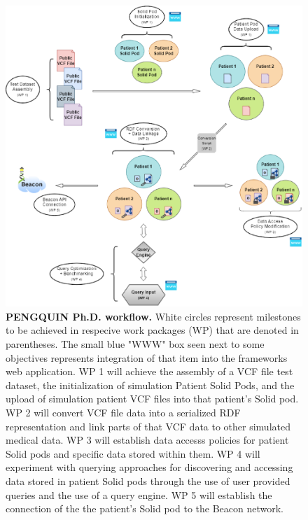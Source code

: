 \documentclass[runningheads]{llncs}
\begin{document}
\begin{figure}
\includegraphics[width=\textwidth]{fig1.eps}
\caption{\textbf{PENGQUIN Ph.D. workflow.}
White circles represent milestones to be achieved in respecive work packages (WP) that are denoted in parentheses. 
The small blue "WWW" box seen next to some objectives represents integration of that item into the framework\textquotesingle s web application.
WP 1 will achieve the assembly of a VCF file test dataset, the initialization of simulation Patient Solid Pods, and the upload of simulation patient VCF files into that patient's Solid pod.
WP 2 will convert VCF file data into a serialized RDF representation and link parts of that VCF data to other simulated medical data.
WP 3 will establish data accesss policies for patient Solid pods and specific data stored within them.
WP 4 will experiment with querying approaches for discovering and accessing data stored in patient Solid pods through the use of user provided queries and the use of a query engine.
WP 5 will establish the connection of the the patient's Solid pod to the Beacon network.
} \label{fig1}
\end{figure}

\end{document}
